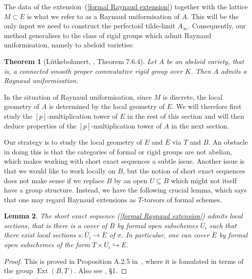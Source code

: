 \documentclass[10pt,oneside]{amsart}
\newtheorem{theorem}{Theorem}[section]
\newtheorem{lemma}[theorem]{Lemma}
\theoremstyle{definition}
\begin{document}
	The data of the extension~(\ref{formal Raynaud extension}) together with the lattice $M\subset E$ is what we refer to as a Raynaud uniformisation of $A$. This will be the only input we need to construct the perfectoid tilde-limit $A_\infty$. Consequently, our method generalises to the class of rigid groups which admit Raynaud uniformisation, namely to abeloid varieties:
	\begin{theorem}[L\"utkebohmert, \cite{Lut}, Theorem 7.6.4]\label{Raynaud uniformisation for abeloids}
		Let $A$ be an abeloid variety, that is, a connected smooth proper commutative rigid group over $K$. Then $A$ admits a Raynaud uniformisation.
	\end{theorem}
	
	In the situation of Raynaud uniformisation, since $M$ is discrete, the local geometry of $A$ is determined by the local geometry of $E$. We will therefore first study the $[p]$-multiplication tower of $E$ in the rest of this section and will then deduce properties of the $[p]$-multiplication tower of $A$ in the next section.

	 Our strategy is to study the local geometry of $E$ and $\overline{E}$ via $T$ and $B$. An obstacle in doing this is that the categories of formal or rigid groups are not abelian, which makes working with short exact sequences a subtle issue. Another issue is that we would like to work locally on $B$, but the notion of short exact sequences does not make sense if we replace $B$ by an open $U\subseteq B$ which might not itself have a group structure.
	Instead, we have the following crucial lemma, which says that one may regard Raynaud extensions as $T$-torsors of formal schemes.

	\begin{lemma}\label{formal Raynaud sequence is locally split}
		The short exact sequence (\ref{formal Raynaud extension}) admits local sections, that is there is a cover of $\overline{B}$ by formal open subschemes $\overline{U}_i$ such that there exist local sections $s:\overline{U}_i\rightarrow \overline{E}$ of $\pi$. In particular, one can cover $\overline{E}$ by formal open subschemes of the form $\overline{T}\times \overline{U}_i\hookrightarrow \overline{E}$.
	\end{lemma}
	\begin{proof}
		This is proved in Proposition A.2.5 in~\cite{Lut}, where it is fomulated in terms of the group $\operatorname{Ext}(B,T)$. Also see \cite{BL}, \S 1.
	\end{proof}
\end{document}
